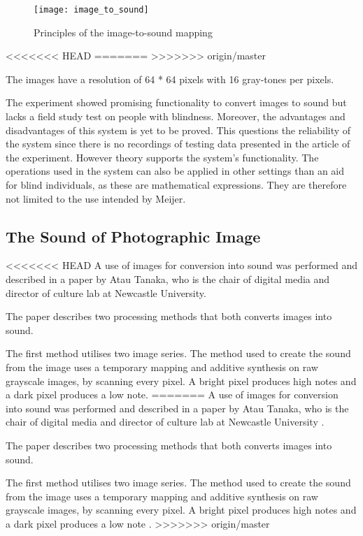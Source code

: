\begin{figure}[!h] 
\centering
\texttt{[image: image\_to\_sound]}
\caption{\label{fig:image_to_sound} Principles of the image-to-sound mapping \cite{Meijer1992}}
\end{figure}
\cite{Meijer1992}

<<<<<<< HEAD
=======
>>>>>>> origin/master
  
The images have a resolution of 64 * 64 pixels with 16 gray-tones per pixels.  

The experiment showed promising functionality to convert images to sound but lacks a field study test on people with blindness. Moreover, the advantages and disadvantages of this system is yet to be proved. This questions the reliability of the system since there is no recordings of testing data presented in the article of the experiment. However theory supports the system's functionality. The operations used in the system can also be applied in other settings than an aid for blind individuals, as these are mathematical expressions. They are therefore not limited to the use intended by Meijer.

\subsection{The Sound of Photographic Image}\label{sec:soundarticle}

<<<<<<< HEAD
A use of images for conversion into sound was performed and described in a paper by Atau Tanaka, who is the chair of digital media and director of culture lab at Newcastle University\cite{Tanaka2012}.

The paper describes two processing methods that both converts images into sound.

The first method utilises two image series. The method used to create the sound from the image uses a temporary mapping and additive synthesis on raw grayscale images, by scanning every pixel. A bright pixel produces high notes and a dark pixel produces a low note.
=======
A use of images for conversion into sound was performed and described in a paper by Atau Tanaka, who is the chair of digital media and director of culture lab at Newcastle University \cite{Tanaka2012}.

The paper describes two processing methods that both converts images into sound.

The first method utilises two image series. The method used to create the sound from the image uses a temporary mapping and additive synthesis on raw grayscale images, by scanning every pixel. A bright pixel produces high notes and a dark pixel produces a low note \cite{Tanaka2012}.
>>>>>>> origin/master

